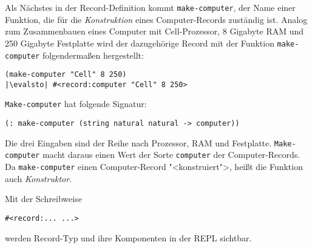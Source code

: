Als Nächstes in der Record-Definition kommt \lstinline{make-computer},
der Name einer Funktion, die für die \textit{Konstruktion} eines
Computer-Records zuständig ist.  Analog zum Zusammenbauen eines
Computer mit Cell-Prozessor, 8 Gigabyte RAM und 250 Gigabyte
Festplatte wird der dazugehörige Record mit der Funktion
\lstinline{make-computer} folgendermaßen hergestellt:
%
\begin{lstlisting}
(make-computer "Cell" 8 250)
|\evalsto| #<record:computer "Cell" 8 250>
\end{lstlisting}
%
\lstinline{Make-computer} hat folgende Signatur:
%
\begin{lstlisting}
(: make-computer (string natural natural -> computer))
\end{lstlisting}
%
Die drei Eingaben sind der Reihe nach Prozessor, RAM und Festplatte.
\lstinline{Make-computer} macht daraus einen Wert der Sorte
\lstinline{computer} der Computer-Records.  Da \lstinline{make-computer}
einen Computer-Record "<konstruiert">, heißt die Funktion auch
\textit{Konstruktor}.

Mit der Schreibweise
%
\begin{lstlisting}
#<record:... ...>
\end{lstlisting}
%
werden Record-Typ und ihre Komponenten in der REPL sichtbar.

